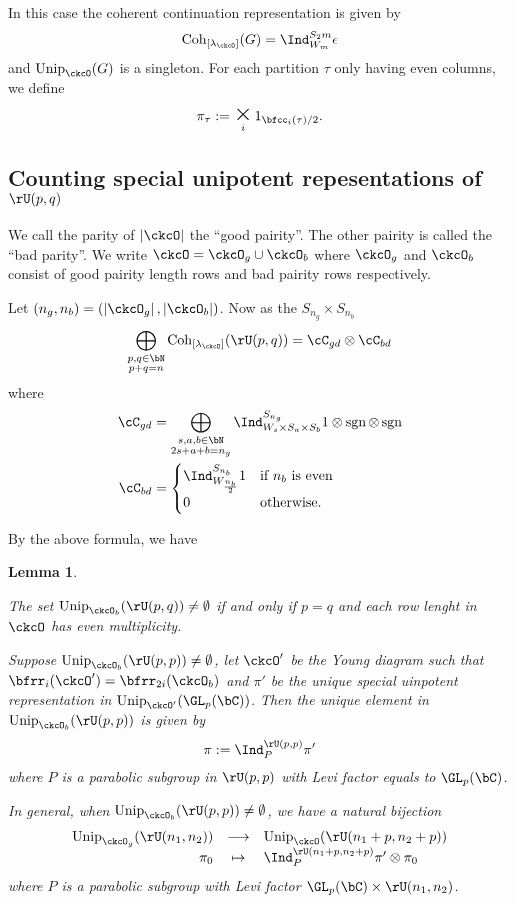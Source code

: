 \documentclass[12pt,a4paper]{amsart}
\def\abs#1{\left|{#1}\right|}
\newcommand{\sgn}{\operatorname{sgn}}
\newcommand{\p}{\mathfrak p}
\numberwithin{equation}{section}
\newtheorem{lem}[thm]{Lemma}
\theoremstyle{remark}
\def\Unip{\mathrm{Unip}}
\begin{document}
In this case the coherent continuation representation is given by  
\[
  \Cint{\lamck}(G) = \Ind_{W_m}^{S_2m}\epsilon 
\]
and $\Unip_\ckcO(G)$ is a singleton. %
For each partition $\tau$ only having even columns, we define 
\[
  \pi_{\tau} := \bigtimes_i 1_{\bfcc_i(\tau)/2}. 
\] 

\subsection{Counting special unipotent repesentations of $\rU(p,q)$}
We call the parity of $\abs{\ckcO}$ the ``good pairity''.  The other pairity is called the ``bad parity''. 
We write $\ckcO = \ckcO_g\cup \ckcO_b$ where $\ckcO_g$ and $\ckcO_b$ consist of good pairity length rows 
and bad pairity rows respectively.  

Let $(n_g,n_b) = (\abs{\ckcO_g},\abs{\ckcO_b})$.
Now as the $S_{n_g}\times S_{n_b}$ 
\[
\bigoplus_{\substack{p,q\in \bN\\p+q=n}} \Cint{\lamck}(\rU(p,q)) = \cC_{gd}\otimes \cC_{bd}
\]
where 
\[
  \begin{split}
 \cC_{gd} &= \bigoplus_{\substack{s,a,b\in \bN\\2s+a+b=n_g}} \Ind_{W_{s}\times S_a\times S_b}^{S_{n_g}}
 1\otimes \sgn\otimes \sgn \\
 \cC_{bd} &= \begin{cases}
  \Ind_{W_{\frac{n_b}{2}}}^{S_{n_b}} 1 & \text{if $n_b$ is even}\\
  0 & \text{otherwise}. 
 \end{cases}
  \end{split}
\]

By the above formula, we have
\begin{lem}
  \begin{enumT}
    \item
The set $\Unip_{\ckcO_b}(\rU(p,q))\neq \emptyset$ if and only if $p=q$ and 
each row lenght in $\ckcO$ has even multiplicity.
\item
Suppose $\Unip_{\ckcO_b}(\rU(p,p))\neq \emptyset$, let $\ckcO'$ be the Young diagram 
such that $\bfrr_i(\ckcO') = \bfrr_{2i}(\ckcO_b)$ and $\pi'$ be the unique special 
uinpotent representation in $\Unip_{\ckcO'}(\GL_{p}(\bC))$. 
Then the unique element in $\Unip_{\ckcO_b}(\rU(p,p))$  is given by 
\[
  \pi := \Ind_{P}^{\rU(p,p)} \pi'
\]
where $P$ is a parabolic subgroup in $\rU(p,p)$ with Levi factor equals
to $\GL_p(\bC)$.
\item 
In general, when $\Unip_{\ckcO_b}(\rU(p,p))\neq \emptyset$, we have a natural bijection 
\[  
  \begin{array}{rcl}
  \Unip_{\ckcO_g}(\rU(n_1,n_2)) &\longrightarrow& \Unip_{\ckcO}(\rU(n_1+p,n_2+p))\\
  \pi_0 & \mapsto & \Ind_P^{\rU(n_1+p,n_2+p)} \pi'\otimes \pi_0
  \end{array}
\]
where $P$ is a parabolic subgroup with Levi factor $\GL_p(\bC)\times \rU(n_1,n_2)$. 
  \end{enumT}
\end{lem}
\end{document}
